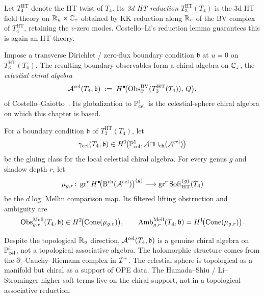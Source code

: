 \begin{definition}
\label{def:uch-ht-twist}
Let $T_4^{\mathrm{HT}}$ denote the HT twist of $T_4$. Its \emph{3d HT
reduction} $T_3^{\mathrm{HT}}(T_4)$ is the $3$d HT field theory on
$\mathbb R_u \times \mathbb C_z$ obtained by KK reduction along $\mathbb R_v$ of the
BV complex of $T_4^{\mathrm{HT}}$, retaining the $v$-zero modes.
Costello--Li's reduction lemma
\cite[Thm.~6.2]{CostelloLiTwistedSugra} guarantees this is again an
HT theory.
\end{definition}

\begin{definition}
\label{def:uch-boundary-chiral-algebra}
Impose a transverse Dirichlet / zero-flux boundary condition
$\mathfrak b$ at
$u = 0$ on $T_3^{\mathrm{HT}}(T_4)$. The resulting boundary observables
form a chiral algebra on $\mathbb C_z$, the \emph{celestial chiral algebra}
\[
\mathcal A^{\mathrm{cel}}(T_4,\mathfrak b)
\;:=\;
H^\bullet\!\bigl(\operatorname{Obs}_\partial^{\text{BV}}(T_3^{\mathrm{HT}}(T_4)),\,Q\bigr),
\]
of Costello--Gaiotto~\cite{CostelloGaiottoBoundaryVOA}. Its
globalization to $\mathbb P^1_{\text{cel}}$ is the celestial-sphere
chiral algebra on which this chapter is based.
\end{definition}

\begin{definition}
\label{def:uch-comparison-classes}
For a boundary condition $\mathfrak b$ of $T_3^{\mathrm{HT}}(T_4)$,
let
\[
\gamma_{\mathrm{cel}}(T_4,\mathfrak b)
\in
H^1\!\bigl(\mathbb P^1_{\mathrm{cel}},
\mathcal{Aut}_{\mathrm{ch}}(\mathcal A^{\mathrm{cel}})\bigr)
\]
be the gluing class for the local celestial chiral algebra. For every
genus $g$ and shadow depth $r$, let
\[
\mu_{g,r}\colon
\operatorname{gr}^r H^\bullet\!\bigl(\mathrm B^{\mathrm{ch}}(\mathcal A^{\mathrm{cel}})\bigr)^{(g)}
\longrightarrow
\operatorname{gr}^r\mathrm{Soft}^{(g)}_{\mathrm{HT}}(T_4)
\]
be the $d\log$ Mellin comparison map. Its filtered lifting obstruction
and ambiguity are
\[
\operatorname{Obs}^{\mathrm{Mell}}_{g,r}(T_4,\mathfrak b)
\in H^2\!\bigl(\operatorname{Cone}(\mu_{g,r})\bigr),
\qquad
\mathrm{Amb}^{\mathrm{Mell}}_{g,r}(T_4,\mathfrak b)
= H^1\!\bigl(\operatorname{Cone}(\mu_{g,r})\bigr).
\]
\end{definition}

\begin{remark}
\label{rem:uch-chiral-not-topological}
Despite the topological $\mathbb R_u$ direction,
$\mathcal A^{\mathrm{cel}}(T_4,\mathfrak b)$ is a genuine chiral algebra on
$\mathbb P^1_{\text{cel}}$, not a topological associative algebra. The
holomorphic structure comes from the
$\bar\partial_z$-Cauchy--Riemann complex in $\mathcal I^+$. The celestial
sphere is topological as a manifold but chiral as a support of OPE
data. The Hamada--Shiu / Li--Strominger higher-soft terms live on the
chiral support, not in a topological associative reduction.
\end{remark}

